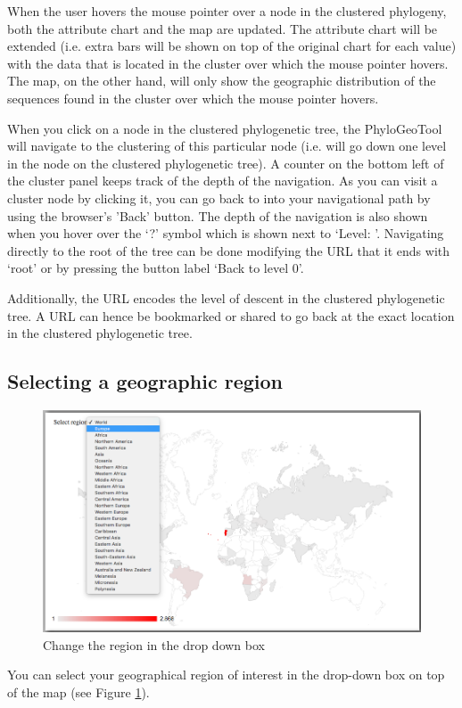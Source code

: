 \documentclass[a4paper, 11pt]{article} %
\begin{document}
When the user hovers the mouse pointer over a node in the clustered phylogeny, both the attribute chart and the map are updated. 
The attribute chart will be extended (i.e. extra bars will be shown on top of the original chart for each value) with the data that is located in the cluster over which the mouse pointer hovers.
The map, on the other hand, will only show the geographic distribution of the sequences found in the cluster over which the mouse pointer hovers.

When you click on a node in the clustered phylogenetic tree, the PhyloGeoTool will navigate to the clustering of this particular node (i.e. will go down one level in the node on the clustered phylogenetic tree).
A counter on the bottom left of the cluster panel keeps track of the depth of the navigation. 
As you can visit a cluster node by clicking it, you can go back to into your navigational path by using the browser's 'Back' button.
The depth of the navigation is also shown when you hover over the `?' symbol which is shown next to `Level: '. 
Navigating directly to the root of the tree can be done modifying the URL that it ends with `root' or by pressing the button label `Back to level 0'.

Additionally, the URL encodes the level of descent in the clustered phylogenetic tree. 
A URL can hence be bookmarked or shared to go back at the exact location in the clustered phylogenetic tree. 


\subsection{Selecting a geographic region}
\begin{figure}[H]
\centering
\includegraphics[scale=0.38]{images/change_country.PNG}
\vspace{-0.75cm}
\caption{Change the region in the drop down box}
\label{fig:change_region}
\end{figure}
You can select your geographical region of interest in the drop-down box on top of the map (see Figure \ref{fig:change_region}). 
\end{document}
